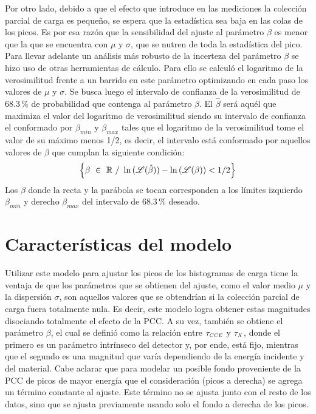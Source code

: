 Por otro lado, debido a que el efecto que introduce en las mediciones la colección parcial de carga es pequeño, se espera que la estadística sea baja en las colas de los picos. Es por esa razón que la sensibilidad del ajuste al parámetro $\beta$ es menor que la que se encuentra con $\mu$ y $\sigma$, que se nutren de toda la estadística del pico. Para llevar adelante un análisis más robusto de la incerteza del parámetro $\beta$ se hizo uso de otras herramientas de cálculo. Para ello se calculó el logaritmo de la verosimilitud frente a un barrido en este parámetro optimizando en cada paso los valores de $\mu$ y $\sigma$. Se busca luego el intervalo de confianza de la verosimilitud de $68.3\,\%$ de probabilidad que contenga al parámetro $\beta$. El $\hat{\beta}$ será aquél que maximiza el valor del logaritmo de verosimilitud siendo su intervalo de confianza el conformado por $\beta_{min}$ y $\beta_{max}$ tales que el logaritmo de la verosimilitud tome el valor de su máximo menos 1/2, es decir, el intervalo está conformado por aquellos valores de $\beta$ que cumplan la siguiente condición:
\begin{equation*}
    \left\{
        \beta\ \in\ \mathbb{R}\ /\ 
        \ln{(\Lagr(\hat{\beta}))}
        -
        \ln{
            \left(
                \Lagr(\beta)
            \right)
            }
        < 1/2
    \right\}
\end{equation*}
Los $\beta$ donde la recta y la parábola se tocan corresponden a los límites izquierdo $\beta_{min}$ y derecho $\beta_{max}$ del intervalo de $68.3\,\%$ deseado\cite{Frodesen}.


\section{Características del modelo}

\noindent Utilizar este modelo para ajustar los picos de los histogramas de carga tiene la ventaja de que los parámetros que se obtienen del ajuste, como el valor medio $\mu$ y la dispersión $\sigma$, son aquellos valores que se obtendrían si la colección parcial de carga fuera totalmente nula. Es decir, este modelo logra obtener estas magnitudes disociando totalmente el efecto de la PCC. A su vez, también se obtiene el parámetro $\beta$, el cual se definió como la relación entre $\tau_{\scaleto{CCE}{4pt}}$ y $\tau_{\scaleto{X}{4pt}}$, donde el primero es un parámetro intrínseco del detector y, por ende, está fijo, mientras que el segundo es una magnitud que varía dependiendo de la energía incidente y del material. Cabe aclarar que para modelar un posible fondo proveniente de la PCC de picos de mayor energía que el consideración (picos a derecha) se agrega un término constante al ajuste. Este término no se ajusta junto con el resto de los datos, sino que se ajusta previamente usando solo el fondo a derecha de los picos.

